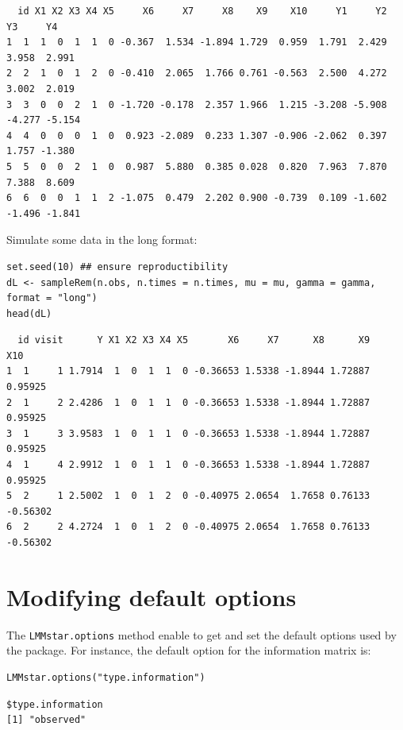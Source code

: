 \documentclass[12pt]{article}
\begin{document}
\begin{verbatim}
  id X1 X2 X3 X4 X5     X6     X7     X8    X9    X10     Y1     Y2     Y3     Y4
1  1  1  0  1  1  0 -0.367  1.534 -1.894 1.729  0.959  1.791  2.429  3.958  2.991
2  2  1  0  1  2  0 -0.410  2.065  1.766 0.761 -0.563  2.500  4.272  3.002  2.019
3  3  0  0  2  1  0 -1.720 -0.178  2.357 1.966  1.215 -3.208 -5.908 -4.277 -5.154
4  4  0  0  0  1  0  0.923 -2.089  0.233 1.307 -0.906 -2.062  0.397  1.757 -1.380
5  5  0  0  2  1  0  0.987  5.880  0.385 0.028  0.820  7.963  7.870  7.388  8.609
6  6  0  0  1  1  2 -1.075  0.479  2.202 0.900 -0.739  0.109 -1.602 -1.496 -1.841
\end{verbatim}


Simulate some data in the long format:
\lstset{language=r,label= ,caption= ,captionpos=b,numbers=none}
\begin{lstlisting}
set.seed(10) ## ensure reproductibility
dL <- sampleRem(n.obs, n.times = n.times, mu = mu, gamma = gamma, format = "long")
head(dL)
\end{lstlisting}

\begin{verbatim}
  id visit      Y X1 X2 X3 X4 X5       X6     X7      X8      X9      X10
1  1     1 1.7914  1  0  1  1  0 -0.36653 1.5338 -1.8944 1.72887  0.95925
2  1     2 2.4286  1  0  1  1  0 -0.36653 1.5338 -1.8944 1.72887  0.95925
3  1     3 3.9583  1  0  1  1  0 -0.36653 1.5338 -1.8944 1.72887  0.95925
4  1     4 2.9912  1  0  1  1  0 -0.36653 1.5338 -1.8944 1.72887  0.95925
5  2     1 2.5002  1  0  1  2  0 -0.40975 2.0654  1.7658 0.76133 -0.56302
6  2     2 4.2724  1  0  1  2  0 -0.40975 2.0654  1.7658 0.76133 -0.56302
\end{verbatim}


\clearpage

\section{Modifying default options}
\label{sec:org8d6fd6c}
The \texttt{LMMstar.options} method enable to get and set the default options
used by the package. For instance, the default option for the information matrix is:
\lstset{language=r,label= ,caption= ,captionpos=b,numbers=none}
\begin{lstlisting}
LMMstar.options("type.information")
\end{lstlisting}

\begin{verbatim}
$type.information
[1] "observed"
\end{verbatim}
\end{document}
